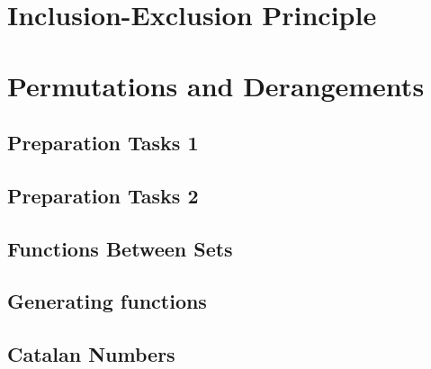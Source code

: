 \documentclass{article}
\newcommand{\includelectureSub}[1]{%
  \begingroup
    \renewcommand{\section}{\subsection}%
  \endgroup
}
\newcommand{\includelectureNoHeader}[1]{%
  \begingroup
    \let\maketitle\relax%
  \endgroup
}
\begin{document}
\section{Inclusion-Exclusion Principle}
\includelectureNoHeader{Inclusion_Exclusion}

\section{Permutations and Derangements}
\includelectureSub{Permutations_Derangements}

\section{Preparation Tasks 1}
\includelectureSub{Preparation_tasks1}

\section{Preparation Tasks 2}
\includelectureSub{Preparation_tasks2}

\section{Functions Between Sets}
\includelectureNoHeader{Functions_between_sets}

\section{Generating functions}
\includelectureSub{Generating_functions}

\section{Catalan Numbers}
\includelectureSub{Catalan_Numbers}
\end{document}
